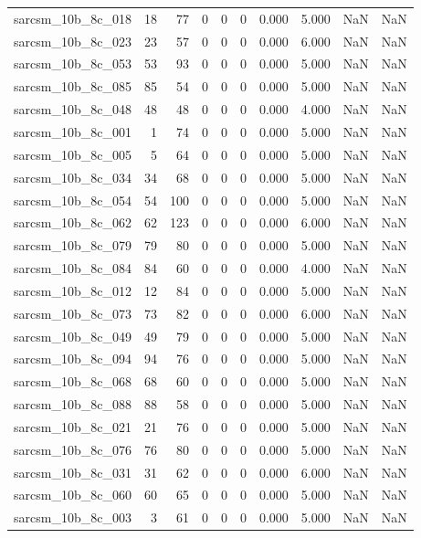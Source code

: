 \documentclass{article}
\begin{document}
\begin{longtable}{lrrrrrrrrr}
sarcsm\_10b\_8c\_018 & 18 & 77 & 0 & 0 & 0 & 0.000 & 5.000 & NaN & NaN \\
sarcsm\_10b\_8c\_023 & 23 & 57 & 0 & 0 & 0 & 0.000 & 6.000 & NaN & NaN \\
sarcsm\_10b\_8c\_053 & 53 & 93 & 0 & 0 & 0 & 0.000 & 5.000 & NaN & NaN \\
sarcsm\_10b\_8c\_085 & 85 & 54 & 0 & 0 & 0 & 0.000 & 5.000 & NaN & NaN \\
sarcsm\_10b\_8c\_048 & 48 & 48 & 0 & 0 & 0 & 0.000 & 4.000 & NaN & NaN \\
sarcsm\_10b\_8c\_001 & 1 & 74 & 0 & 0 & 0 & 0.000 & 5.000 & NaN & NaN \\
sarcsm\_10b\_8c\_005 & 5 & 64 & 0 & 0 & 0 & 0.000 & 5.000 & NaN & NaN \\
sarcsm\_10b\_8c\_034 & 34 & 68 & 0 & 0 & 0 & 0.000 & 5.000 & NaN & NaN \\
sarcsm\_10b\_8c\_054 & 54 & 100 & 0 & 0 & 0 & 0.000 & 5.000 & NaN & NaN \\
sarcsm\_10b\_8c\_062 & 62 & 123 & 0 & 0 & 0 & 0.000 & 6.000 & NaN & NaN \\
sarcsm\_10b\_8c\_079 & 79 & 80 & 0 & 0 & 0 & 0.000 & 5.000 & NaN & NaN \\
sarcsm\_10b\_8c\_084 & 84 & 60 & 0 & 0 & 0 & 0.000 & 4.000 & NaN & NaN \\
sarcsm\_10b\_8c\_012 & 12 & 84 & 0 & 0 & 0 & 0.000 & 5.000 & NaN & NaN \\
sarcsm\_10b\_8c\_073 & 73 & 82 & 0 & 0 & 0 & 0.000 & 6.000 & NaN & NaN \\
sarcsm\_10b\_8c\_049 & 49 & 79 & 0 & 0 & 0 & 0.000 & 5.000 & NaN & NaN \\
sarcsm\_10b\_8c\_094 & 94 & 76 & 0 & 0 & 0 & 0.000 & 5.000 & NaN & NaN \\
sarcsm\_10b\_8c\_068 & 68 & 60 & 0 & 0 & 0 & 0.000 & 5.000 & NaN & NaN \\
sarcsm\_10b\_8c\_088 & 88 & 58 & 0 & 0 & 0 & 0.000 & 5.000 & NaN & NaN \\
sarcsm\_10b\_8c\_021 & 21 & 76 & 0 & 0 & 0 & 0.000 & 5.000 & NaN & NaN \\
sarcsm\_10b\_8c\_076 & 76 & 80 & 0 & 0 & 0 & 0.000 & 5.000 & NaN & NaN \\
sarcsm\_10b\_8c\_031 & 31 & 62 & 0 & 0 & 0 & 0.000 & 6.000 & NaN & NaN \\
sarcsm\_10b\_8c\_060 & 60 & 65 & 0 & 0 & 0 & 0.000 & 5.000 & NaN & NaN \\
sarcsm\_10b\_8c\_003 & 3 & 61 & 0 & 0 & 0 & 0.000 & 5.000 & NaN & NaN \\

\end{longtable}
\end{document}
